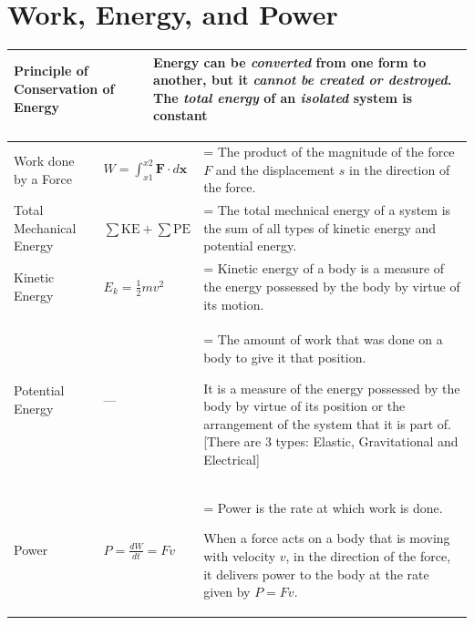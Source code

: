 \documentclass[a4paper,11pt]{article}
\newlength{\oldparskip}
\begin{document}
	\section{Work, Energy, and Power}
		\begin{center}
			\renewcommand{\arraystretch}{1.2}
			\begin{tabular}{@{} p{4.5cm} p{9.5cm} @{}}
				\toprule
				Principle of Conservation of Energy & Energy can be \textbf{\textit{converted}} from one form to another, but it \textbf{\textit{cannot be created or destroyed}}. The \textbf{\textit{total energy}} of an \textbf{\textit{isolated}} system is constant\\
				\bottomrule
			\end{tabular}
		\end{center}
		\begin{center}
			\renewcommand{\arraystretch}{1.2}
			\begin{tabular}{@{} l l >{\parskip=\oldparskip}p{7.7cm} @{}}
				\toprule
				Work done by a Force & $\displaystyle W=\int_{x1}^{x2} \textbf{F} \cdot d\textbf{x} $ & The product of the magnitude of the force $F$ and the displacement $s$ in the direction of the force. \\
				Total Mechanical Energy & $\sum \textrm{KE} + \sum \textrm{PE}$ & The total mechnical energy of a system is the sum of all types of kinetic energy and potential energy. \\
				Kinetic Energy & $E_k = \frac{1}{2}mv^2$ & Kinetic energy of a body is a measure of the energy possessed by the body by virtue of its motion.\\
				Potential Energy & --- & The amount of work that was done on a body to give it that position. \par It is a measure of the energy possessed by the body by virtue of its position or the arrangement of the system that it is part of. [There are 3 types: Elastic, Gravitational and Electrical]\\
				Power & $\displaystyle P=\frac{dW}{dt}=Fv$ & Power is the rate at which work is done. \par When a force acts on a body that is moving with velocity $v$, in the direction of the force, it delivers power to the body at the rate given by $P=Fv$.\\
				\bottomrule
			\end{tabular}
		\end{center}
\end{document}
